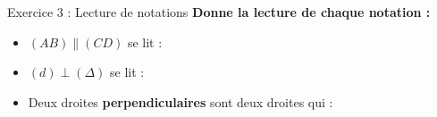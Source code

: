 \documentclass[11pt,a4paper]{article}
\begin{document}
\begin{exercisebox}{ Exercice 3 : Lecture de notations }
\textbf{Donne la lecture de chaque notation :}

\smallspace

\begin{itemize}[label=$\bullet$,leftmargin=*]
\item $(AB) \parallel (CD)$ se lit : 

\vspace{0.3cm}

\item $(d) \perp (\Delta)$ se lit : 

\vspace{0.3cm}

\item Deux droites \textbf{perpendiculaires} sont deux droites qui :

\end{itemize}
\end{exercisebox}

\smallspace
\end{document}
